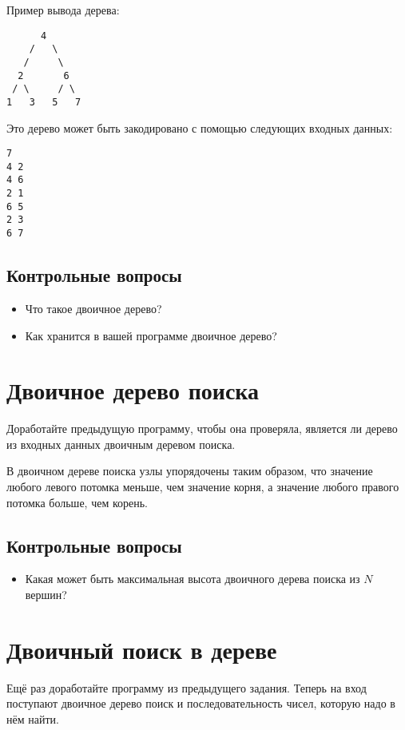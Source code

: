 \documentclass[10pt,twoside,openany]{book}
\begin{document}
Пример вывода дерева:
\begin{verbatim}
      4
    /   \
   /     \
  2       6
 / \     / \
1   3   5   7
\end{verbatim}

Это дерево может быть закодировано с помощью следующих входных данных:
\begin{verbatim}
7
4 2
4 6
2 1
6 5
2 3
6 7
\end{verbatim}

\subsection*{Контрольные вопросы}

\begin{itemize}
    \item Что такое двоичное дерево?
    \item Как хранится в вашей программе двоичное дерево?
\end{itemize}

\section{Двоичное дерево поиска}

Доработайте предыдущую программу, чтобы она проверяла, является ли дерево из входных
данных двоичным деревом поиска.

В двоичном дереве поиска узлы упорядочены таким образом, что значение любого левого потомка
меньше, чем значение корня, а значение любого правого потомка больше, чем корень.

\subsection*{Контрольные вопросы}

\begin{itemize}
    \item Какая может быть максимальная высота двоичного дерева поиска из $N$ вершин?
\end{itemize}

\section{Двоичный поиск в дереве}

Ещё раз доработайте программу из предыдущего задания.
Теперь на вход поступают двоичное дерево поиск и последовательность чисел, которую надо в нём
найти.
\end{document}

